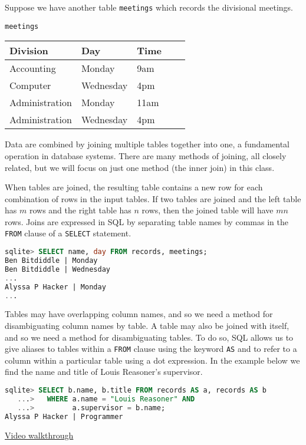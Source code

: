 Suppose we have another table \texttt{meetings} which records the divisional
meetings.

\begin{center}
    \texttt{meetings}\\
    \begin{tabular}{ l l l l l }
        \textbf{Division} & \textbf{Day} & \textbf{Time} \\
        \hline
        Accounting     & Monday    & 9am \\
        Computer       & Wednesday & 4pm \\
        Administration & Monday    & 11am\\
        Administration & Wednesday  & 4pm \\
    \end{tabular}
\end{center}

Data are combined by joining multiple tables together into one, a fundamental
operation in database systems. There are many methods of joining, all closely
related, but we will focus on just one method (the inner join) in this class.

When tables are joined, the resulting table contains a new row for each
combination of rows in the input tables. If two tables are joined and the left
table has $m$ rows and the right table has $n$ rows, then the joined table will
have $mn$ rows. Joins are expressed in SQL by separating table names by commas
in the \texttt{FROM} clause of a \texttt{SELECT} statement.

\begin{lstlisting}[language=SQL]
sqlite> SELECT name, day FROM records, meetings;
Ben Bitdiddle | Monday
Ben Bitdiddle | Wednesday
...
Alyssa P Hacker | Monday
...
\end{lstlisting}

Tables may have overlapping column names, and so we need a method for
disambiguating column names by table. A table may also be joined with itself,
and so we need a method for disambiguating tables. To do so, SQL allows us to
give aliases to tables within a \texttt{FROM} clause using the keyword
\texttt{AS} and to refer to a column within a particular table using a dot
expression. In the example below we find the name and title of Louis Reasoner's
supervisor.

\begin{lstlisting}[language=SQL]
sqlite> SELECT b.name, b.title FROM records AS a, records AS b
   ...>   WHERE a.name = "Louis Reasoner" AND
   ...>         a.supervisor = b.name;
Alyssa P Hacker | Programmer
\end{lstlisting}
\begin{solution}[0.1in]
\href{https://youtu.be/XGgJVmpw-SM}{Video walkthrough}
\end{solution}
